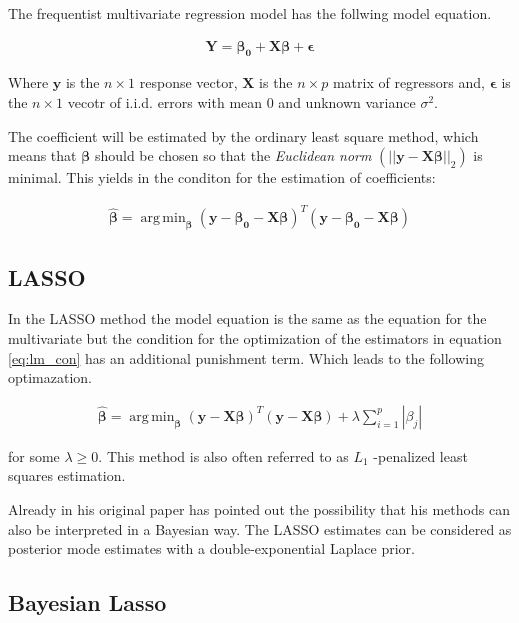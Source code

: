 \documentclass[12pt,a4paper]{article}
\DeclareMathOperator*{\argmin}{arg\,min}
\begin{document}
The frequentist multivariate regression model has the follwing model
equation.

\begin{align}
\label{eq:lm}
\pmb{Y = \beta_0 + X \beta} + \pmb{\epsilon}
\end{align}

Where \(\pmb{y}\) is the \(n \times 1\) response vector, \(\pmb{X}\) is
the \(n \times p\) matrix of regressors and, \(\pmb{\epsilon}\) is the
\(n \times 1\) vecotr of \ac{i.i.d.} errors with mean 0 and unknown
variance \(\sigma^2\).

The coefficient will be estimated by the ordinary least square method,
which means that \(\pmb{\beta}\) should be chosen so that the
\emph{Euclidean norm} \(\left( || \mathbf{y - X\beta} ||_2 \right)\) is
minimal. This yields in the conditon for the estimation of coefficients:

\begin{align}
\label{eq:lm_con}
 \hat{\pmb{\beta}} = \argmin_{ \pmb{\beta}} (\pmb{y - \beta_0 - X  \beta})^T (\pmb{y - \beta_0 - X  \beta})
\end{align}

\hypertarget{section}{%
\subsection{\texorpdfstring{\acf{LASSO}}{}}\label{section}}

In the \ac{LASSO} method the model equation is the same as the equation
for the multivariate but the condition for the optimization of the
estimators in equation \eqref{eq:lm_con} has an additional punishment
term. Which leads to the following optimazation.

\begin{align}
\label{eq:la_con}
\hat{\pmb{\beta}} = \argmin_{\pmb{\beta}}  \left( \pmb{y - X \beta} \right)^T \left( \pmb{y - X \beta} \right) + \lambda \sum_{i = 1}^{p} |\beta_j|
\end{align}

for some \(\lambda \geq 0\). This method is also often referred to as
\(L_1\) -penalized least squares estimation.

Already in his original paper \textcite{tibshirani_regression_1996} has
pointed out the possibility that his methods can also be interpreted in
a Bayesian way. The LASSO estimates can be considered as posterior mode
estimates with a double-exponential Laplace prior.

\hypertarget{bayesian-lasso}{%
\subsection{Bayesian Lasso}\label{bayesian-lasso}}
\end{document}
